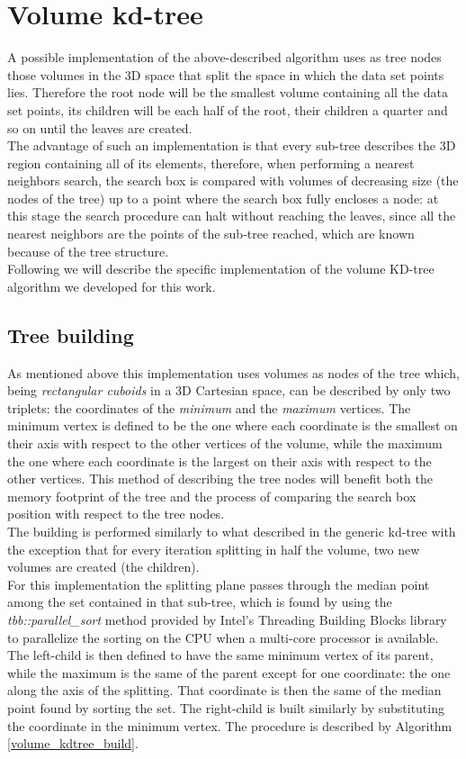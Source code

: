\section{Volume kd-tree}
A possible implementation of the above-described algorithm uses as tree nodes those volumes in the 3D space that split the space in which the data set points lies. Therefore the root node will be the smallest volume containing all the data set points, its children will be each half of the root, their children a quarter and so on until the leaves are created.\\
The advantage of such an implementation is that every sub-tree describes the 3D region containing all of its elements, therefore, when performing a nearest neighbors search, the search box is compared with volumes of decreasing size (the nodes of the tree) up to a point where the search box fully encloses a node: at this stage the search procedure can halt without reaching the leaves, since all the nearest neighbors are the points of the sub-tree reached, which are known because of the tree structure.\\

Following we will describe the specific implementation of the volume KD-tree algorithm we developed for this work.
\subsection{Tree building}\label{sec:volumeKDBuild}
As mentioned above this implementation uses volumes as nodes of the tree which, being \textit{rectangular cuboids} in a 3D Cartesian space, can be described by only two triplets: the coordinates of the \textit{minimum} and the \textit{maximum} vertices. The minimum vertex is defined to be the one where each coordinate is the smallest on their axis with respect to the other vertices of the volume, while the maximum the one where each coordinate is the largest on their axis with respect to the other vertices. This method of describing the tree nodes will benefit both the memory footprint of the tree and the process of comparing the search box position with respect to the tree nodes.\\
The building is performed similarly to what described in the generic kd-tree with the exception that for every iteration splitting in half the volume, two new volumes are created (the children).\\
For this implementation the splitting plane passes through the median point among the set contained in that sub-tree, which is found by using the \textit{tbb::parallel\_sort} method provided by Intel's Threading Building Blocks library \cite{intel_tbb} to parallelize the sorting on the CPU when a multi-core processor is available.\\
The left-child is then defined to have the same minimum vertex of its parent, while the maximum is the same of the parent except for one coordinate: the one along the axis of the splitting. That coordinate is then the same of the median point found by sorting the set. The right-child is built similarly by substituting the coordinate in the minimum vertex. The procedure is described by Algorithm \ref{volume_kdtree_build}.\\

